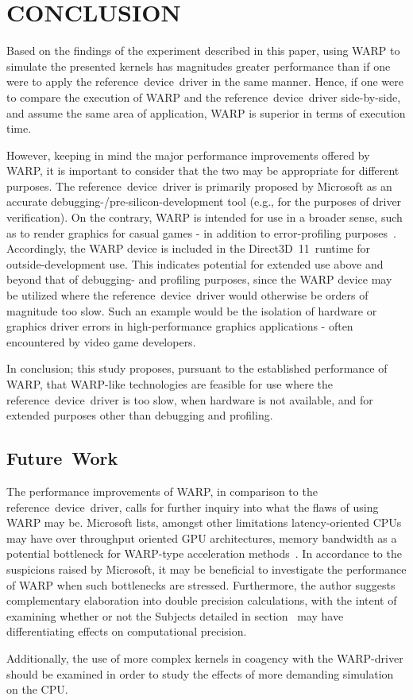 
\section{CONCLUSION}
\label{sec:conclusion}
Based on the findings of the experiment described in this paper, using WARP to simulate the presented kernels has magnitudes greater performance than if one were to apply the reference~device~driver in the same manner.
Hence, if one were to compare the execution of WARP and the reference~device~driver side-by-side, and assume the same area of application, WARP is superior in terms of execution time.

However, keeping in mind the major performance improvements offered by WARP, it is important to consider that the two may be appropriate for different purposes.
The reference~device~driver is primarily proposed by Microsoft as an accurate debugging-/pre-silicon-development tool (e.g., for the purposes of driver verification).
On the contrary, WARP is intended for use in a broader sense, such as to render graphics for casual games - in addition to error-profiling purposes~.
Accordingly, the WARP device is included in the Direct3D~11~runtime for outside-development use.
This indicates potential for extended use above and beyond that of debugging- and profiling purposes, since the WARP device may be utilized where the reference~device~driver would otherwise be orders of magnitude too slow.
Such an example would be the isolation of hardware or graphics driver errors in high-performance graphics applications - often encountered by video game developers.

In conclusion; this study proposes, pursuant to the established performance of WARP, that WARP-like technologies are feasible for use where the reference~device~driver is too slow, when hardware is not available, and for extended purposes other than debugging and profiling.

\subsection{Future~Work}
\label{sec:conclusion:futurework}
The performance improvements of WARP, in comparison to the reference~device~driver, calls for further inquiry into what the flaws of using WARP may be.
Microsoft lists, amongst other limitations latency-oriented CPUs may have over throughput oriented GPU architectures, memory bandwidth as a potential bottleneck for WARP-type acceleration methods~.
In accordance to the suspicions raised by Microsoft, it may be beneficial to investigate the performance of WARP when such bottlenecks are stressed.
Furthermore, the author suggests complementary elaboration into double precision calculations, with the intent of examining whether or not the Subjects detailed in section~ may have differentiating effects on computational precision.

Additionally, the use of more complex kernels in coagency with the WARP-driver should be examined in order to study the effects of more demanding simulation on the CPU.
